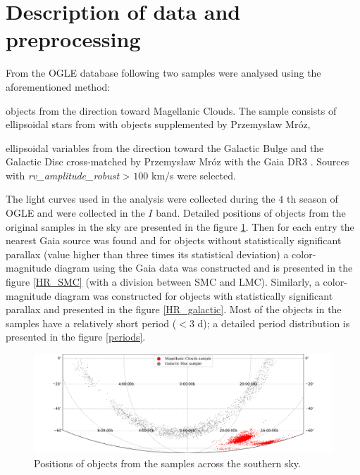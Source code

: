 \documentclass{pracalicmgr}
\newenvironment{itemize*}%
  {\vspace{-\topsep}
    \begin{itemize}%
    \setlength{\itemsep}{0pt}%
    \setlength{\parskip}{0pt}}%
  {\end{itemize}
  \vspace{-\topsep}}
\begin{document}
\section{Description of data and preprocessing}
From the OGLE \citep{udalski_optical_1992} database following two samples were analysed using the aforementioned method:
\begin{itemize*}
    \item objects from the direction toward Magellanic Clouds. The sample consists of ellipsoidal stars from \citet{pawlak_ogle_2016} with objects supplemented 
    by Przemysław Mróz, 
    \item ellipsoidal variables from the direction toward the Galactic Bulge and the Galactic Disc cross-matched by Przemysław Mróz with the Gaia DR3 
    \citep{gaia_collaboration_gaia_2022}. Sources with  {\it{rv\_amplitude\_robust}} > $100$ km/s were selected.
\end{itemize*}
The light curves used in the analysis were collected during the $4$ th season of OGLE \citet{udalski_ogle-iv_2015}
and were collected in the $I$ band.
Detailed positions of objects from the original samples in the sky are presented in the figure \ref{map}. Then for each entry the nearest Gaia source
was found and for objects without statistically significant parallax (value higher than three times its statistical deviation) a color-magnitude
diagram using the Gaia data was constructed and is presented in the figure \ref{HR_SMC} (with a division between SMC and LMC). Similarly, a color-magnitude diagram was constructed for
objects with statistically significant parallax and presented in the figure \ref{HR_galactic}.
Most of the objects in the samples have a relatively short period ($<3$ d); a detailed period distribution
is presented in the figure \ref{periods}.
\begin{figure}
    \begin{center}
        \includegraphics[scale=0.52]{plots/map_sample.png}
    \end{center}
    \caption{Positions of objects from the samples across the southern sky.}
    \label{map}
\end{figure}
\end{document}
